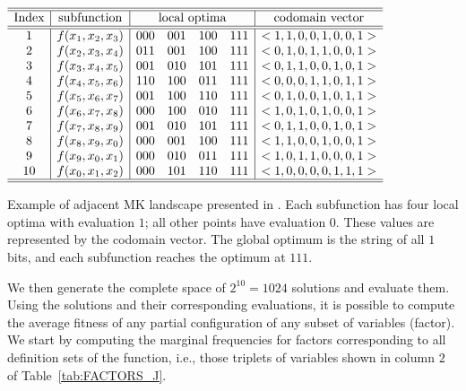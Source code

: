 \documentclass{article} %
\begin{document}
\begin{table}[htb]
\scriptsize
\begin{center}
{$\begin{array}{c|c|c c c c|c} \hline \hline
  \text{Index}  & \text{subfunction} & \multicolumn{4}{c|}{\text{local optima}}  & \text{codomain vector}  \\  \hline  \hline
  1 &  f(x_1,x_2,x_3)  &   000 & 001 & 100 & 111 & <1,1,0,0,1,0,0,1> \\ 
  2 &  f(x_2,x_3,x_4)  &   011 & 001 & 100 & 111 & <0,1,0,1,1,0,0,1> \\ 
  3 &  f(x_3,x_4,x_5)  &   001 & 010 & 101 & 111 & <0,1,1,0,0,1,0,1> \\ 
  4 &  f(x_4,x_5,x_6)  &   110 & 100 & 011 & 111 & <0,0,0,1,1,0,1,1> \\ 
  5 &  f(x_5,x_6,x_7)  &   001 & 100 & 110 & 111 & <0,1,0,0,1,0,1,1> \\ 
  6 &  f(x_6,x_7,x_8)  &   000 & 100 & 010 & 111 & <1,0,1,0,1,0,0,1> \\ 
  7 &  f(x_7,x_8,x_9)  &   001 & 010 & 101 & 111 & <0,1,1,0,0,1,0,1> \\ 
  8 &  f(x_8,x_9,x_0)  &   000 & 001 & 100 & 111 & <1,1,0,0,1,0,0,1> \\ 
  9 &  f(x_9,x_0,x_1)  &   000 & 010 & 011 & 111 & <1,0,1,1,0,0,0,1> \\ 
  10&   f(x_0,x_1,x_2)  &   000 & 101 & 110 & 111 & <1,0,0,0,0,1,1,1> \\ \hline  \hline
    \end{array}$}
\caption{Example of adjacent MK landscape presented in \cite{Whitley:2015}. Each subfunction has four local optima with evaluation $1$; all other points have evaluation $0$. These values are represented by the codomain vector. The global optimum is the string of all $1$ bits, and each subfunction reaches the optimum at $111$.}
\label{tab:FUNCTION_WHITLEY}
\end{center}
\end{table}


 We then generate the complete space of $2^{10}=1024$ solutions and evaluate them. Using the solutions and their corresponding evaluations, it is possible to compute the average fitness of any partial configuration of any subset of variables (factor). We start by computing the marginal frequencies for factors corresponding to all definition sets of the function, i.e., those triplets of variables shown in column $2$ of Table~\ref{tab:FACTORS_J}.
\end{document}
